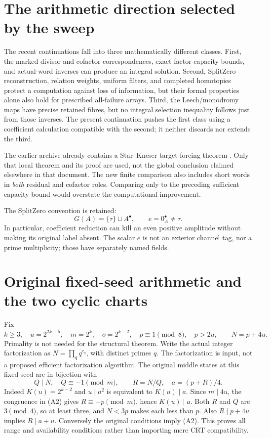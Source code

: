 \section{The arithmetic direction selected by the sweep}
The recent continuations fall into three mathematically different classes.
First, the marked divisor and cofactor correspondences, exact factor-capacity
bounds, and actual-word inverses can produce an integral solution. Second,
SplitZero reconstruction, relation weights, uniform filters, and completed
homotopies protect a computation against loss of information, but their formal
properties alone also hold for prescribed all-failure arrays. Third, the
Leech/monodromy maps have precise retained fibres, but no integral selection
inequality follows just from those inverses. The present continuation pushes
the first class using a coefficient calculation compatible with the second;
it neither discards nor extends the third.

The earlier archive already contains a Star--Kneser target-forcing theorem
\cite[\S12.1, Theorem 12.1, pp.~37--38]{Archive}. Only that local theorem and its
proof are used, not the global conclusion claimed elsewhere in that document.
The new finite comparison also includes short words in \emph{both} residual
and cofactor roles. Comparing only to the preceding sufficient capacity bound
would overstate the computational improvement.

The SplitZero convention is retained:
\[
 G(A)=\{\tau\}\sqcup A^\bullet,\qquad e=0_A^\bullet\ne\tau.
\]
In particular, coefficient reduction can kill an even positive amplitude
without making its original label absent. The scalar $e$ is not an exterior
channel tag, nor a prime multiplicity; those have separately named fields.

\section{Original fixed-seed arithmetic and the two cyclic charts}
Fix
\[
 k\ge3,\quad u=2^{2k-5},\quad m=2^k,\quad o=2^{k-2},\quad
 p\equiv1\pmod8,\quad p>2u,\qquad N=p+4u.                 \tag{A1}
\]
Primality is not needed for the structural theorem. Write the actual integer
factorization as $N=\prod_q q^{e_q}$, with distinct primes $q$.
The factorization is input, not a proposed efficient factorization algorithm.
The original middle states at this fixed seed are in bijection with
\[
 \boxed{Q\mid N,\quad Q\equiv-1\pmod m,\qquad
 R=N/Q,\quad a=(p+R)/4.}                                  \tag{A2}
\]
Indeed $K(u)=2^{k-2}$ and $u\mid a^2$ is equivalent to $K(u)\mid a$.
Since $m\mid4u$, the congruence in (A2) gives $R\equiv-p\pmod m$, hence
$K(u)\mid a$. Both $R$ and $Q$ are $3\pmod4$, so at least three, and
$N<3p$ makes each less than $p$. Also $R\mid p+4u$ implies $R\mid a+u$.
Conversely the original conditions imply (A2). This proves all range and
availability conditions rather than importing mere CRT compatibility.

